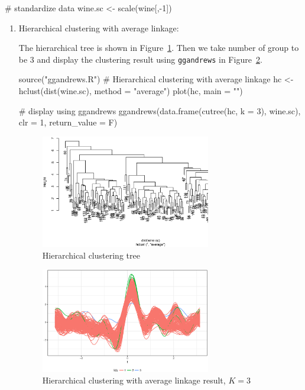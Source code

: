 \documentclass{article}
\begin{document}
\begin{enumerate}[leftmargin = 0 em, label = \arabic*., font = \bfseries]
\begin{rcode}
# standardize data
wine.sc <- scale(wine[,-1])
	\end{rcode}
	\begin{enumerate}
		\item 
		Hierarchical clustering with average linkage:

		The hierarchical tree is shown in Figure~\ref{tree}. Then we take number of group to be 3 and display the clustering result using \verb|ggandrews| in Figure~\ref{hc}.
		\begin{rcode}
source("ggandrews.R")
# Hierarchical clustering with average linkage
hc <- hclust(dist(wine.sc), method = "average")
plot(hc, main = "")

# display using ggandrews
ggandrews(data.frame(cutree(hc, k = 3), wine.sc), clr = 1, return_value = F)
		\end{rcode}

		\begin{figure}[!htb]
			\centering
			\includegraphics[width = 0.7\textwidth]{tree.eps}
			\caption{Hierarchical clustering tree}
			\label{tree}
		\end{figure}

		\begin{figure}[!htb]
			\centering
			\includegraphics[width = 0.7\textwidth]{hc.eps}
			\caption{Hierarchical clustering with average linkage result, $K = 3$}
			\label{hc}
		\end{figure}


\end{enumerate}
\end{enumerate}
\end{document}
